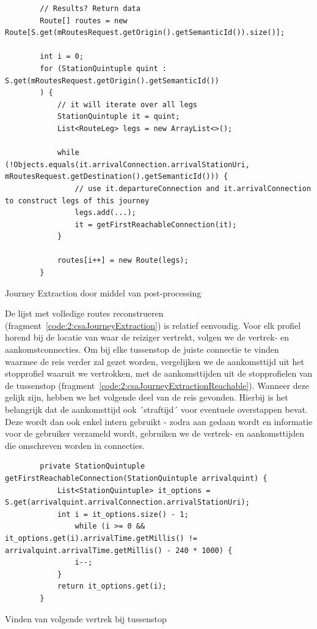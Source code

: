 \begin{listing}[h]
	\begin{verbatim}
		// Results? Return data
		Route[] routes = new Route[S.get(mRoutesRequest.getOrigin().getSemanticId()).size()];
		
		int i = 0;
		for (StationQuintuple quint : S.get(mRoutesRequest.getOrigin().getSemanticId())
		) {
			// it will iterate over all legs
			StationQuintuple it = quint;
			List<RouteLeg> legs = new ArrayList<>();
			
			while (!Objects.equals(it.arrivalConnection.arrivalStationUri, mRoutesRequest.getDestination().getSemanticId())) {
				// use it.departureConnection and it.arrivalConnection to construct legs of this journey
				legs.add(...);
				it = getFirstReachableConnection(it);
			}
			
			routes[i++] = new Route(legs);
		}
	\end{verbatim}
	\caption[CSA: Journey extraction]{Journey Extraction door middel van post-processing}
	\label{code:2:csaJourneyExtraction}
\end{listing}

De lijst met volledige routes reconstrueren (fragment~\ref{code:2:csaJourneyExtraction}) is relatief eenvoudig. Voor elk profiel horend bij de locatie van waar de reiziger vertrekt, volgen we de vertrek- en aankomstconnecties. Om bij elke tussenstop de juiste connectie te vinden waarmee de reis verder zal gezet worden, vergelijken we de aankomsttijd uit het stopprofiel waaruit we vertrokken, met de aankomsttijden uit de stopprofielen van de tussenstop (fragment~\ref{code:2:csaJourneyExtractionReachable}). Wanneer deze gelijk zijn, hebben we het volgende deel van de reis gevonden. Hierbij is het belangrijk dat de aankomsttijd ook ´straftijd´ voor eventuele overstappen bevat. Deze wordt dan ook enkel intern gebruikt - zodra aan  gedaan wordt en informatie voor de gebruiker verzameld wordt, gebruiken we de vertrek- en aankomsttijden die omschreven worden in connecties.

\begin{listing}[h]
	\begin{verbatim}
		private StationQuintuple getFirstReachableConnection(StationQuintuple arrivalquint) {
			List<StationQuintuple> it_options = S.get(arrivalquint.arrivalConnection.arrivalStationUri);
			int i = it_options.size() - 1;
				while (i >= 0 && it_options.get(i).arrivalTime.getMillis() != arrivalquint.arrivalTime.getMillis() - 240 * 1000) {
				i--;
			}
			return it_options.get(i);
		}
	\end{verbatim}
	\caption[CSA: Journey extraction bij tussenstops]{Vinden van volgende vertrek bij tussenstop}
	\label{code:2:csaJourneyExtractionReachable}
\end{listing}

